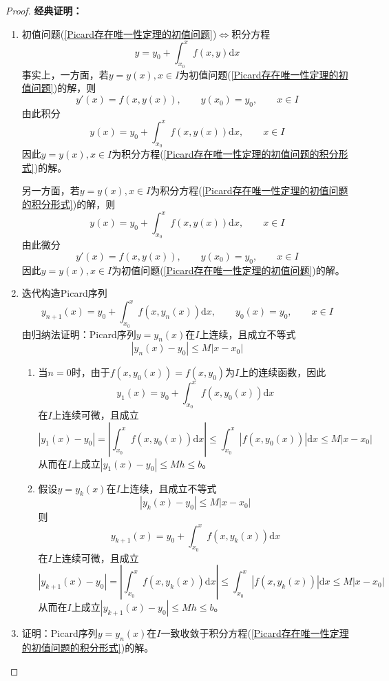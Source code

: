 \documentclass[lang = cn, scheme = chinese, thmcnt = section]{elegantbook}
\newcommand{\dd}{\mathrm{d}}           %
\begin{document}
\begin{proof}
	{\bf 经典证明：}
	\begin{enumerate}
		\item 初值问题(\ref{Picard存在唯一性定理的初值问题})$\iff$积分方程
		\begin{equation*}
			y=y_0+\int_{x_0}^{x}f(x,y)\dd x
			\label{Picard存在唯一性定理的初值问题的积分形式}
			\tag{2}
		\end{equation*}
		事实上，一方面，若$y=y(x),x\in I$为初值问题(\ref{Picard存在唯一性定理的初值问题})的解，则%
		$$
		y'(x)=f(x,y(x)),\qquad y(x_0)=y_0,\qquad x\in I
		$$
		由此积分%
		$$
		y(x)=y_0+\int_{x_0}^{x}f(x,y(x))\dd x,\qquad x\in I
		$$
		因此$y=y(x),x\in I$为积分方程(\ref{Picard存在唯一性定理的初值问题的积分形式})的解。
		
		另一方面，若$y=y(x),x\in I$为积分方程(\ref{Picard存在唯一性定理的初值问题的积分形式})的解，则
		$$
		y(x)=y_0+\int_{x_0}^{x}f(x,y(x))\dd x,\qquad x\in I
		$$
		由此微分
		$$
		y'(x)=f(x,y(x)),\qquad y(x_0)=y_0,\qquad x\in I
		$$
		因此$y=y(x),x\in I$为初值问题(\ref{Picard存在唯一性定理的初值问题})的解。
		\item 迭代构造Picard序列
		\begin{equation*}
			y_{n+1}(x)=y_0+\int_{x_0}^{x}f(x,y_n(x))\dd x,\qquad y_0(x)=y_0,\qquad x\in I
			\label{Picard序列}
			\tag{3}
		\end{equation*}
		由归纳法证明：Picard序列$y=y_n(x)$在$I$上连续，且成立不等式%
		$$
		|y_n(x)-y_0|\le M|x-x_0|
		$$
		\begin{enumerate}
			\item 当$n=0$时，由于$f(x,y_0(x))=f(x,y_0)$为$I$上的连续函数，因此%
			$$
			y_{1}(x)=y_0+\int_{x_0}^{x}f(x,y_0(x))\dd x
			$$
			在$I$上连续可微，且成立
			\begin{equation*}
				|y_1(x)-y_0|=
				\left| \int_{x_0}^{x}f(x,y_0(x))\dd x \right|
				\le \int_{x_0}^{x}|f(x,y_0(x))|\dd x
				\le M|x-x_0|
				\label{Picard序列的第一式}
				\tag{4}
			\end{equation*}
			从而在$I$上成立$|y_1(x)-y_0|\le Mh\le b$。
			\item 假设$y=y_k(x)$在$I$上连续，且成立不等式%
			$$
			|y_k(x)-y_0|\le M|x-x_0|
			$$
			则%
			$$
			y_{k+1}(x)=y_0+\int_{x_0}^{x}f(x,y_k(x))\dd x
			$$
			在$I$上连续可微，且成立
			$$
			|y_{k+1}(x)-y_0|=
			\left| \int_{x_0}^{x}f(x,y_k(x))\dd x \right|
			\le \int_{x_0}^{x}|f(x,y_k(x))|\dd x
			\le M|x-x_0|
			$$
			从而在$I$上成立$|y_{k+1}(x)-y_0|\le Mh\le b$。
		\end{enumerate}
		\item 证明：Picard序列$y=y_n(x)$在$I$一致收敛于积分方程(\ref{Picard存在唯一性定理的初值问题的积分形式})的解。
		

\end{enumerate}
\end{proof}
\end{document}

